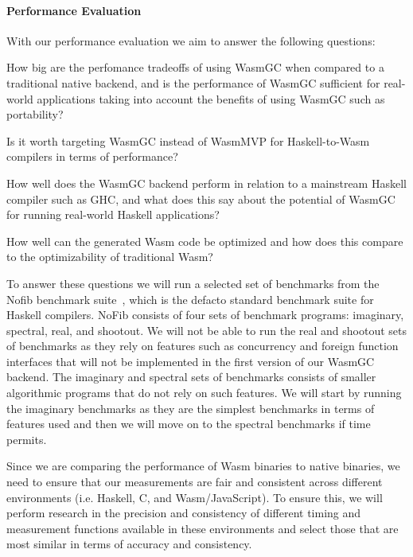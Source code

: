 \paragraph{Performance Evaluation} With our performance evaluation we aim to answer the following questions:
\begin{questions}
    \item How big are the perfomance tradeoffs of using WasmGC when compared to a traditional native backend, and is the performance of WasmGC sufficient for real-world applications taking into account the benefits of using WasmGC such as portability?
    \item Is it worth targeting WasmGC instead of WasmMVP for Haskell-to-Wasm compilers in terms of performance?
    \item How well does the WasmGC backend perform in relation to a mainstream Haskell compiler such as GHC, and what does this say about the potential of WasmGC for running real-world Haskell applications?
    \item How well can the generated Wasm code be optimized and how does this compare to the optimizability of traditional Wasm?
\end{questions}

To answer these questions we will run a selected set of benchmarks from the Nofib benchmark suite~\cite{nofib}, which is the defacto standard benchmark suite for Haskell compilers. NoFib consists of four sets of benchmark programs: imaginary, spectral, real, and shootout. We will not be able to run the real and shootout sets of benchmarks as they rely on features such as concurrency and foreign function interfaces that will not be implemented in the first version of our WasmGC backend. The imaginary and spectral sets of benchmarks consists of smaller algorithmic programs that do not rely on such features. We will start by running the imaginary benchmarks as they are the simplest benchmarks in terms of features used and then we will move on to the spectral benchmarks if time permits. 

Since we are comparing the performance of Wasm binaries to native binaries, we need to ensure that our measurements are fair and consistent across different environments (i.e. Haskell, C, and Wasm/JavaScript). To ensure this, we will perform research in the precision and consistency of different timing and measurement functions available in these environments and select those that are most similar in terms of accuracy and consistency.

